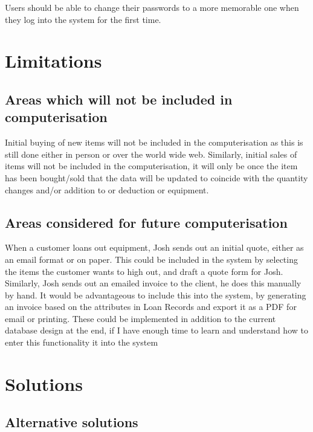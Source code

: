 \noindent Users should be able to change their passwords to a more memorable one when they log into the system for the first time.

\section{Limitations}

\subsection{Areas which will not be included in computerisation}

Initial buying of new items will not be included in the computerisation as this is still done either in person or over the world wide web. Similarly, initial sales of items will not be included in the computerisation, it will only be once the item has been bought/sold that the data will be updated to coincide with the quantity changes and/or addition to or deduction or equipment.

\subsection{Areas considered for future computerisation}

When a customer loans out equipment, Josh sends out an initial quote, either as an email format or on paper. This could be included in the system by selecting the items the customer wants to high out, and draft a quote form for Josh. Similarly, Josh sends out an emailed invoice to the client, he does this manually by hand. It would be advantageous to include this into the system, by generating an invoice based on the attributes in Loan Records and export it as a PDF for email or printing. These could be implemented in addition to the current database design at the end, if I have enough time to learn and understand how to enter this functionality it into the system

\section{Solutions}

\subsection{Alternative solutions}



